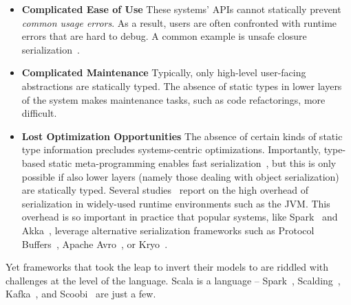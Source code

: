 \documentclass[preprint]{sigplanconf}
\theoremstyle{definition}
\theoremstyle{definition}
\begin{document}
\begin{itemize}

\item {\bf Complicated Ease of Use} These systems' APIs cannot statically
prevent {\em common usage errors}. As a result, users are often confronted
with runtime errors that are hard to debug. A common example is unsafe closure
serialization~\cite{Spores}.

\item {\bf Complicated Maintenance} Typically, only high-level user-facing abstractions are statically
typed.  The absence of static types in lower layers of the system makes
maintenance tasks, such as code refactorings, more difficult.

\item {\bf Lost Optimization Opportunities} The absence of certain kinds of
static type information precludes systems-centric optimizations. Importantly,
type-based static meta-programming enables fast serialization~\cite{Pickling},
but this is only possible if also lower layers (namely those dealing with
object serialization) are statically typed. Several
studies~\cite{JavaSerialization, JavaRMI, MoreEfficientJavaRMI, Jaguar} report
on the high overhead of serialization in widely-used runtime environments such
as the JVM. This overhead is so important in practice that popular systems,
like Spark~\cite{Spark} and Akka~\cite{Akka}, leverage alternative
serialization frameworks such as Protocol Buffers~\cite{Protobuf}, Apache
Avro~\cite{Avro}, or Kryo~\cite{Kryo}. \end{itemize}

Yet frameworks that took the leap to invert their models to  are riddled with
challenges at the level of the language. Scala is a language --
Spark~\cite{Spark}, Scalding~\cite{Scalding}, Kafka~\cite{Kafka}, and
Scoobi~\cite{Scoobi} are just a few.


\end{document}

